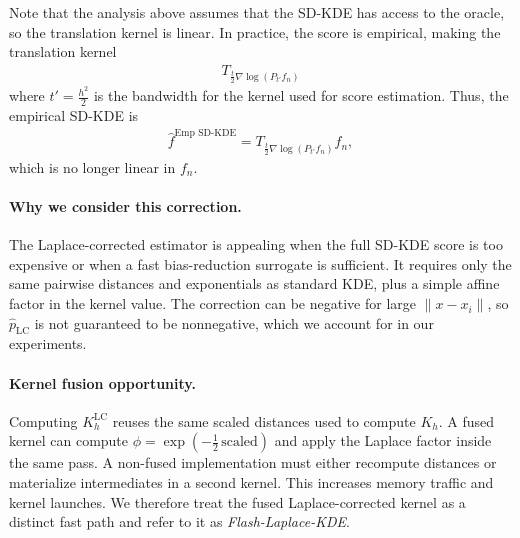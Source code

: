 Note that the analysis above assumes that the SD-KDE has access to the oracle, so the translation kernel is linear. In practice, the score is empirical, making the translation kernel
\begin{align*}
    T_{\frac{t}{2}\nabla \log \left(P_{t'} f_n\right)}
\end{align*}
where $t'=\frac{h^2}{2}$ is the bandwidth for the kernel used for score estimation. Thus, the empirical SD-KDE is
\begin{align*}
    \hat{f}^{\text{Emp SD-KDE}} = T_{\frac{t}{2}\nabla \log \left(P_{t'} f_n\right)} f_n,
\end{align*}
which is no longer linear in $f_n$.


\paragraph{Why we consider this correction.}
The Laplace-corrected estimator is appealing when the full SD-KDE score is too expensive or when a fast bias-reduction surrogate is sufficient.
It requires only the same pairwise distances and exponentials as standard KDE, plus a simple affine factor in the kernel value.
The correction can be negative for large $\lVert x - x_i \rVert$, so $\hat p_{\text{LC}}$ is not guaranteed to be nonnegative, which we account for in our experiments.

\paragraph{Kernel fusion opportunity.}
Computing $K_h^{\text{LC}}$ reuses the same scaled distances used to compute $K_h$.
A fused kernel can compute $\phi = \exp(-\tfrac{1}{2}\,\text{scaled})$ and apply the Laplace factor inside the same pass.
A non-fused implementation must either recompute distances or materialize intermediates in a second kernel.
This increases memory traffic and kernel launches.
We therefore treat the fused Laplace-corrected kernel as a distinct fast path and refer to it as \emph{Flash-Laplace-KDE}.

